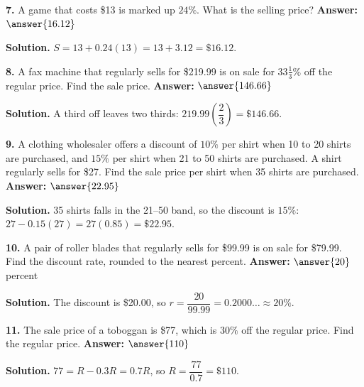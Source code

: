 \documentclass{ximera}
\begin{document}
\begin{problem}
\textbf{7.} A game that costs \$13 is marked up $24\%$. What is the selling price?
\qquad \textbf{Answer:} $\answer{16.12}$

\begin{hint}
\textbf{Solution.} $S=13+0.24(13)=13+3.12=\$16.12$.
\end{hint}
\end{problem}

\begin{problem}
\textbf{8.} A fax machine that regularly sells for \$219.99 is on sale for
$33\frac{1}{3}\%$ off the regular price. Find the sale price.
\qquad \textbf{Answer:} $\answer{146.66}$

\begin{hint}
\textbf{Solution.} A third off leaves two thirds:
$219.99\left(\dfrac{2}{3}\right)=\$146.66$.
\end{hint}
\end{problem}

\begin{problem}
\textbf{9.} A clothing wholesaler offers a discount of $10\%$ per shirt when 10 to 20
shirts are purchased, and $15\%$ per shirt when 21 to 50 shirts are purchased. A shirt
regularly sells for \$27. Find the sale price per shirt when 35 shirts are purchased.
\qquad \textbf{Answer:} $\answer{22.95}$

\begin{hint}
\textbf{Solution.} 35 shirts falls in the 21--50 band, so the discount is $15\%$:
$27-0.15(27)=27(0.85)=\$22.95$.
\end{hint}
\end{problem}

\begin{problem}
\textbf{10.} A pair of roller blades that regularly sells for \$99.99 is on sale for
\$79.99. Find the discount rate, rounded to the nearest percent.
\qquad \textbf{Answer:} $\answer{20}$ percent

\begin{hint}
\textbf{Solution.} The discount is \$20.00, so
$r=\dfrac{20}{99.99}=0.2000\ldots\approx 20\%$.
\end{hint}
\end{problem}

\begin{problem}
\textbf{11.} The sale price of a toboggan is \$77, which is $30\%$ off the regular price.
Find the regular price. \qquad \textbf{Answer:} $\answer{110}$

\begin{hint}
\textbf{Solution.} $77=R-0.3R=0.7R$, so $R=\dfrac{77}{0.7}=\$110$.
\end{hint}
\end{problem}
\end{document}
